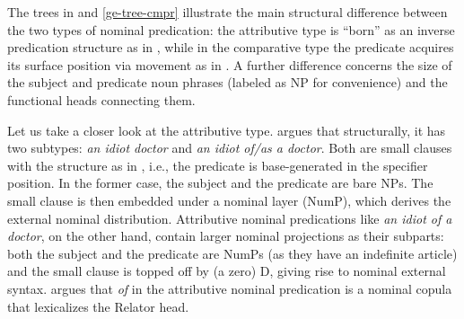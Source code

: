 \documentclass[output=paper]{langscibook}
\begin{document}
The trees in  and \ref{ge-tree-cmpr} illustrate the main structural difference between the two types of nominal predication: the attributive type is ``born'' as an inverse predication structure as in , while in the comparative type the predicate acquires its surface position via movement as in . A further difference concerns the size of the subject and predicate noun phrases (labeled as NP for convenience) and the functional heads connecting them. 

Let us take a closer look at the attributive type.  argues that structurally, it has two subtypes: \emph{an idiot doctor} and \emph{an idiot of/as a doctor}. Both are  small clauses with the structure as in , i.e., the predicate is base-generated in the specifier position. In the former case, the subject and the predicate are bare NPs. The small clause is then embedded under a nominal layer (NumP), which derives the external nominal distribution. Attributive nominal predications like \emph{an idiot of a doctor}, on the other hand, contain larger nominal projections as their subparts: both the subject and the predicate are NumPs (as they have an indefinite article) and the small clause is topped off by (a zero) D, giving rise to nominal external syntax.  argues that \emph{of} in the attributive nominal predication is a nominal copula that lexicalizes the Relator head. 
\end{document}
